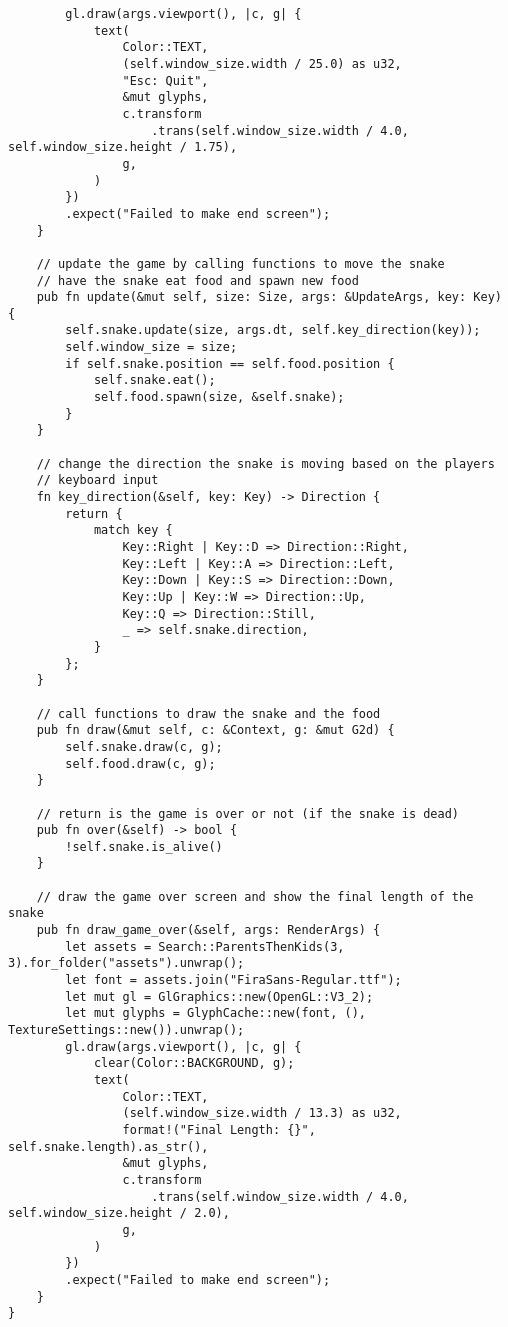 \documentclass{article}
\begin{document}
\begin{verbatim}
        gl.draw(args.viewport(), |c, g| {
            text(
                Color::TEXT,
                (self.window_size.width / 25.0) as u32,
                "Esc: Quit",
                &mut glyphs,
                c.transform
                    .trans(self.window_size.width / 4.0, self.window_size.height / 1.75),
                g,
            )
        })
        .expect("Failed to make end screen");
    }

    // update the game by calling functions to move the snake
    // have the snake eat food and spawn new food
    pub fn update(&mut self, size: Size, args: &UpdateArgs, key: Key) {
        self.snake.update(size, args.dt, self.key_direction(key));
        self.window_size = size;
        if self.snake.position == self.food.position {
            self.snake.eat();
            self.food.spawn(size, &self.snake);
        }
    }

    // change the direction the snake is moving based on the players
    // keyboard input
    fn key_direction(&self, key: Key) -> Direction {
        return {
            match key {
                Key::Right | Key::D => Direction::Right,
                Key::Left | Key::A => Direction::Left,
                Key::Down | Key::S => Direction::Down,
                Key::Up | Key::W => Direction::Up,
                Key::Q => Direction::Still,
                _ => self.snake.direction,
            }
        };
    }

    // call functions to draw the snake and the food
    pub fn draw(&mut self, c: &Context, g: &mut G2d) {
        self.snake.draw(c, g);
        self.food.draw(c, g);
    }

    // return is the game is over or not (if the snake is dead)
    pub fn over(&self) -> bool {
        !self.snake.is_alive()
    }

    // draw the game over screen and show the final length of the snake
    pub fn draw_game_over(&self, args: RenderArgs) {
        let assets = Search::ParentsThenKids(3, 3).for_folder("assets").unwrap();
        let font = assets.join("FiraSans-Regular.ttf");
        let mut gl = GlGraphics::new(OpenGL::V3_2);
        let mut glyphs = GlyphCache::new(font, (), TextureSettings::new()).unwrap();
        gl.draw(args.viewport(), |c, g| {
            clear(Color::BACKGROUND, g);
            text(
                Color::TEXT,
                (self.window_size.width / 13.3) as u32,
                format!("Final Length: {}", self.snake.length).as_str(),
                &mut glyphs,
                c.transform
                    .trans(self.window_size.width / 4.0, self.window_size.height / 2.0),
                g,
            )
        })
        .expect("Failed to make end screen");
    }
}
\end{verbatim}
\end{document}
